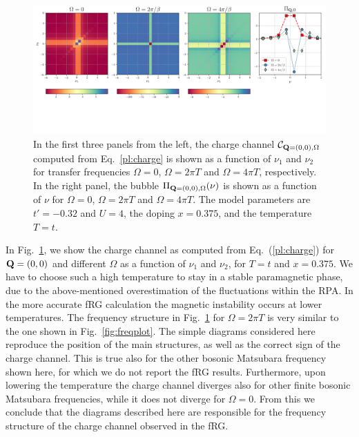 \begin{figure}
\includegraphics[width=\textwidth]{images/PL_all.png}
\vspace*{-2.0cm}
\caption{In the first three panels from the left, the charge channel $\mathcal{C}_{\mathbf{Q}=(0,0),\Omega}$ computed from Eq.~\ref{pl:charge} is shown as 
a function of $\nu_1$ and $\nu_2$ for transfer frequencies $\Omega=0$, $\Omega=2\pi T$ and $\Omega=4\pi T$, respectively. In the right panel, the bubble $\Pi_{\mathbf{Q}=(0,0),\Omega}(\nu)$ is shown as a function of $\nu$ for $\Omega=0$, $\Omega=2\pi T$ and $\Omega=4\pi T$. The model parameters are $t'=-0.32$ and $U=4$, the doping $x=0.375$, and the temperature $T=t$.} 
\label{fig:perpladder}
\end{figure}

In Fig.~\ref{fig:perpladder}, we show the charge channel as computed from Eq.~(\ref{pl:charge}) for $\mathbf{Q}=(0,0)$  and different $\Omega$ as a function of $\nu_1$ and $\nu_2$, for $T=t$ and $x=0.375$.
We have to choose such a high temperature to stay in a stable paramagnetic phase, due to the above-mentioned overestimation of the fluctuations within the RPA. In the more accurate fRG calculation the magnetic instability occurs at lower temperatures.
The frequency structure in Fig.~\ref{fig:perpladder} for $\Omega=2\pi T$ is very similar to the one shown in Fig.~\ref{fig:freqplot}. 
The simple diagrams considered here reproduce the position of the main structures, as well as the correct sign of the charge channel. 
This is true also for the other bosonic Matsubara frequency shown here, for which we do not report the fRG results. 
Furthermore, upon lowering the temperature the charge channel diverges also for other finite bosonic Matsubara frequencies, while it does not diverge for $\Omega=0$.
From this we conclude that the diagrams described here are responsible for the frequency structure of the charge channel observed in the fRG. 

